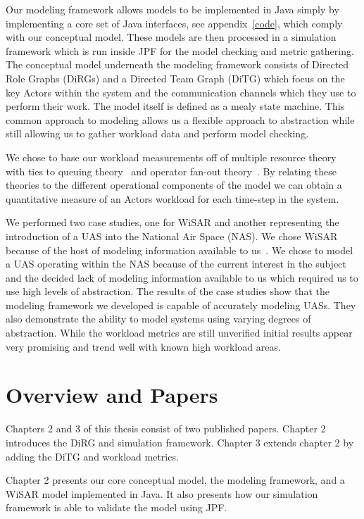 Our modeling framework allows models to be implemented in Java simply by implementing a core set of Java interfaces, see appendix~\ref{code}, which comply with our conceptual model.  These models are then processed in a simulation framework which is run inside JPF for the model checking and metric gathering.  The conceptual model underneath the modeling framework consists of Directed Role Graphs (DiRGs) and a Directed Team Graph (DiTG) which focus on the key Actors within the system and the communication channels which they use to perform their work.  The model itself is defined as a mealy state machine.  This common approach to modeling allows us a flexible approach to abstraction while still allowing us to gather workload data and perform model checking.

We chose to base our workload measurements off of multiple resource theory~\cite{wickens2002multiple} with ties to queuing theory~\cite{newell1994unified} and operator fan-out theory~\cite{goodrich2010fanout}.  By relating these theories to the different operational components of the model we can obtain a quantitative measure of an Actors workload for each time-step in the system.

We performed two case studies, one for WiSAR and another representing the introduction of a UAS into the National Air Space (NAS).  We chose WiSAR because of the host of modeling information available to us~\cite{adams2009cognitive}.  We chose to model a UAS operating within the NAS because of the current interest in the subject~\cite{nasroadmap} and the decided lack of modeling information available to us which required us to use high levels of abstraction.  The results of the case studies show that the modeling framework we developed is capable of accurately modeling UASs.  They also demonstrate the ability to model systems using varying degrees of abstraction.  While the workload metrics are still unverified initial results appear very promising and trend well with known high workload areas.


\section{Overview and Papers}

Chapters 2 and 3 of this thesis consist of two published papers.  Chapter 2 introduces the DiRG and simulation framework.  Chapter 3 extends chapter 2 by adding the DiTG and workload metrics.

Chapter 2 presents our core conceptual model, the modeling framework, and a WiSAR model implemented in Java.  It also presents how our simulation framework is able to validate the model using JPF.

